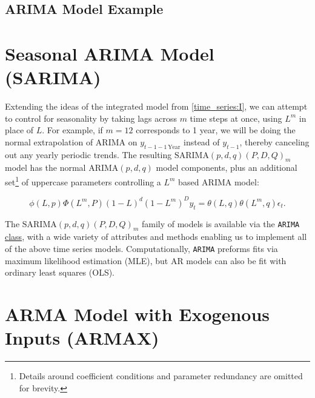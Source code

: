 \subsection{ARIMA Model Example}
\label{time_series:ARIMA:ex}


\section{Seasonal ARIMA Model (SARIMA)}
\label{time_series:SARIMA}

Extending the ideas of the integrated model from \cref{time_series:I},
we can attempt to control for seasonality by
taking lags across $m$ time steps at once, \ie using $L^{m}$ in place of $L$.
For example, if $m=12$ corresponds to 1 year,
we will be doing the normal extrapolation of ARIMA on $y_{t-1-1\,\text{Year}}$ instead of $y_{t-1}$,
thereby canceling out any yearly periodic trends.
The resulting $\text{SARIMA}\left(p,d,q\right)\left(P,D,Q\right)_{m}$ model
has the normal $\text{ARIMA}\left(p,d,q\right)$ model components,
plus an additional set\footnote{Details around
coefficient conditions and parameter redundancy are omitted for brevity.} of uppercase parameters
controlling a $L^{m}$ based ARIMA model:

\begin{equation}\label{eq:time_series:SARMA}
\phi\left(L,p\right) \Phi\left(L^{m},P\right) \left(1-L\right)^{d} \left(1-L^{m}\right)^{D} y_{t} = \theta\left(L,q\right) \theta\left(L^{m},q\right) \epsilon_{t}.
\end{equation}

The $\text{SARIMA}\left(p,d,q\right)\left(P,D,Q\right)_{m}$ family of models
is available via the \texttt{ARIMA}
\href{https://www.statsmodels.org/stable/generated/statsmodels.tsa.arima.model.ARIMA.html}{class},
with a wide variety of attributes and methods
enabling us to implement all of the above time series models.
Computationally, \texttt{ARIMA} preforms fits via maximum likelihood estimation (MLE),
but AR models can also be fit with ordinary least squares (OLS).

\section{ARMA Model with Exogenous Inputs (ARMAX)}
\label{time_series:ARMAX}

